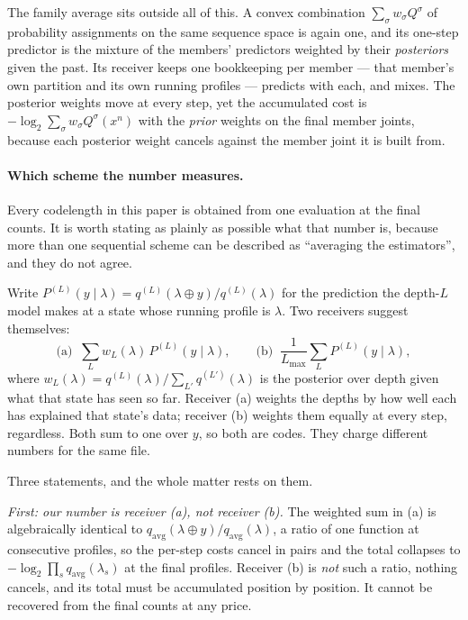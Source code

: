 \documentclass[11pt]{article}
\begin{document}
The family average sits outside all of this.  A convex combination
$\sum_\sigma w_\sigma Q^{\sigma}$ of probability assignments on the same
sequence space is again one, and its one-step predictor is the mixture
of the members' predictors weighted by their \emph{posteriors} given the
past.  Its receiver keeps one bookkeeping per member --- that member's
own partition and its own running profiles --- predicts with each, and
mixes.  The posterior weights move at every step, yet the accumulated
cost is $-\log_2 \sum_\sigma w_\sigma Q^{\sigma}(x^n)$ with the
\emph{prior} weights on the final member joints, because each posterior
weight cancels against the member joint it is built from.

\paragraph{Which scheme the number measures.}  Every codelength in
this paper is obtained from one evaluation at the final counts.  It is
worth stating as plainly as possible what that number is, because more
than one sequential scheme can be described as ``averaging the
estimators'', and they do not agree.

Write $P^{(L)}(y \mid \lambda) = q^{(L)}(\lambda \oplus y)/q^{(L)}(\lambda)$
for the prediction the depth-$L$ model makes at a state whose running
profile is $\lambda$.  Two receivers suggest themselves:
\[
  \text{(a)}\;\; \sum_L w_L(\lambda)\, P^{(L)}(y \mid \lambda),
  \qquad
  \text{(b)}\;\; \frac{1}{L_{\max}} \sum_L P^{(L)}(y \mid \lambda),
\]
where $w_L(\lambda) = q^{(L)}(\lambda) / \sum_{L'} q^{(L')}(\lambda)$ is
the posterior over depth given what that state has seen so far.
Receiver (a) weights the depths by how well each has explained that
state's data; receiver (b) weights them equally at every step,
regardless.  Both sum to one over $y$, so both are codes.  They charge
different numbers for the same file.

Three statements, and the whole matter rests on them.

\emph{First: our number is receiver (a), not receiver (b).}  The
weighted sum in (a) is algebraically identical to
$q_{\mathrm{avg}}(\lambda \oplus y)/q_{\mathrm{avg}}(\lambda)$, a ratio
of one function at consecutive profiles, so the per-step costs cancel
in pairs and the total collapses to $-\log_2 \prod_s
q_{\mathrm{avg}}(\lambda_s)$ at the final profiles.  Receiver (b) is
\emph{not} such a ratio, nothing cancels, and its total must be
accumulated position by position.  It cannot be recovered from the
final counts at any price.
\end{document}
